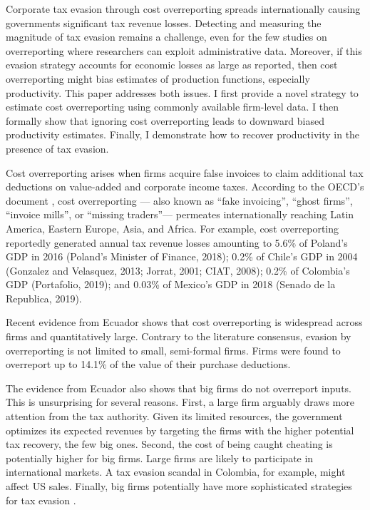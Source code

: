 \documentclass[
  12pt]{article}
\theoremstyle{definition}
\theoremstyle{remark}
\begin{document}
Corporate tax evasion through cost overreporting spreads internationally
causing governments significant tax revenue losses. Detecting and
measuring the magnitude of tax evasion remains a challenge, even for the
few studies on overreporting where researchers can exploit
administrative data. Moreover, if this evasion strategy accounts for
economic losses as large as reported, then cost overreporting might bias
estimates of production functions, especially productivity. This paper
addresses both issues. I first provide a novel strategy to estimate cost
overreporting using commonly available firm-level data. I then formally
show that ignoring cost overreporting leads to downward biased
productivity estimates. Finally, I demonstrate how to recover
productivity in the presence of tax evasion.

Cost overreporting arises when firms acquire false invoices to claim
additional tax deductions on value-added and corporate income taxes.
According to the OECD's document \citet{OECD2017}, cost overreporting
--- also known as ``fake invoicing'', ``ghost firms'', ``invoice
mills'', or ``missing traders''--- permeates internationally reaching
Latin America, Eastern Europe, Asia, and Africa. For example, cost
overreporting reportedly generated annual tax revenue losses amounting
to 5.6\% of Poland's GDP in 2016 (Poland's Minister of Finance, 2018);
0.2\% of Chile's GDP in 2004 (Gonzalez and Velasquez, 2013; Jorrat,
2001; CIAT, 2008); 0.2\% of Colombia's GDP (Portafolio, 2019); and
0.03\% of Mexico's GDP in 2018 (Senado de la Republica, 2019).

Recent evidence from Ecuador \citep{Carrillo2022} shows that cost
overreporting is widespread across firms and quantitatively large.
Contrary to the literature consensus, evasion by overreporting is not
limited to small, semi-formal firms. Firms were found to overreport up
to 14.1\% of the value of their purchase deductions.

The evidence from Ecuador also shows that big firms do not overreport
inputs. This is unsurprising for several reasons. First, a large firm
arguably draws more attention from the tax authority. Given its limited
resources, the government optimizes its expected revenues by targeting
the firms with the higher potential tax recovery, the few big ones.
Second, the cost of being caught cheating is potentially higher for big
firms. Large firms are likely to participate in international markets. A
tax evasion scandal in Colombia, for example, might affect US sales.
Finally, big firms potentially have more sophisticated strategies for
tax evasion \citep[e.g., profit shifting][]{Bustos2022}.
\end{document}
